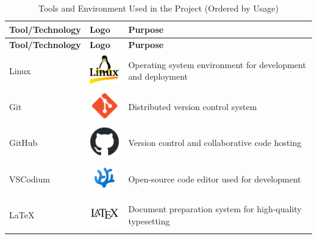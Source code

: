 \begin{longtable}{|m{3.5cm}|m{4cm}|m{6.5cm}|}
    \caption{Tools and Environment Used in the Project (Ordered by Usage)} \label{tab:tools_env_ordered} \\
    \hline
    \textbf{Tool/Technology} & \textbf{Logo} & \textbf{Purpose} \\
    \hline
    \endfirsthead
    
    \hline
    \textbf{Tool/Technology} & \textbf{Logo} & \textbf{Purpose} \\
    \hline
    \endhead
    
    \endfoot
    
    \hline
    \endlastfoot
    Linux & \includegraphics[width=1.5cm]{pictures/web/logo/linux.png} & Operating system environment for development and deployment \\
    \hline
    Git & \includegraphics[width=1.5cm]{pictures/web/logo/git.png} & Distributed version control system \\
    \hline
    GitHub & \includegraphics[width=1.5cm]{pictures/web/logo/github-mark.png} & Version control and collaborative code hosting \\
    \hline
    VSCodium & \includegraphics[width=1.5cm]{pictures/web/logo/vscodium-icon.png} & Open-source code editor used for development \\
    \hline
    LaTeX & \includegraphics[width=1.5cm]{pictures/web/logo/latex.png} & Document preparation system for high-quality typesetting \\

\end{longtable}
